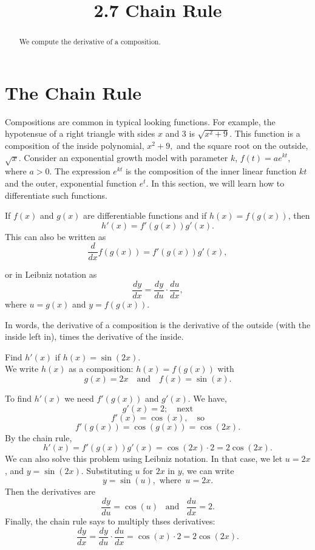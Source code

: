 \documentclass{ximera}
\title{2.7 Chain Rule}
\begin{document}
\begin{abstract}
We compute the derivative of  a composition.
\end{abstract}

\maketitle

\section{The Chain Rule}

Compositions are common in typical looking functions.
For example, the hypotensue of a right triangle with sides $x$ and $3$ is $\sqrt{x^2 + 9}$.  This function is a composition of the inside polynomial, $x^2 + 9,$
and the square root on the outside, $\sqrt{x}$.
Consider an exponential growth model with parameter $k$, $f(t) = ae^{kt}$, where $a>0$. The expression $e^{kt}$ is the composition of the inner linear function $kt$
and the outer, exponential function $e^t$. In this section, we will learn how to differentiate such functions.
\begin{theorem} If $f(x)$ and $g(x)$ are differentiable functions and if $h(x) = f(g(x))$, then
\[
h'(x) = f'(g(x))g'(x).
\]
This can also be written as 
\[
\frac{d}{dx}f(g(x)) = f'(g(x))g'(x),
\]

or in Leibniz notation as 
\[
\frac{dy}{dx} = \frac{dy}{du} \cdot \frac{du}{dx},
\]
where $u = g(x)$ and $y= f(g(x))$.
\end{theorem}



In words, the derivative of a composition is the derivative of the outside (with the inside left in),   
times the derivative of the inside.



\begin{example}[example 1]
Find $h'(x)$ if $h(x) = \sin(2x)$.\\
We write $h(x)$ as a composition: $h(x)=f(g(x))$ with
\[g(x) = 2x   \quad \text{and} \quad  f(x) = \sin(x).\]


To find $h'(x)$ we need $f'(g(x))$ and $g'(x)$. We have,
\[g'(x) = 2; \quad \text{next} \]
\[f'(x) = \cos(x), \quad \text{so}\]
\[f'(g(x)) =\cos(g(x)) = \cos(2x).\]
By the chain rule,
\[h'(x) = f'(g(x))g'(x) = \cos(2x) \cdot 2 = 2\cos(2x).\]
We can also solve this problem using Leibniz notation.  In that case, we let $u = 2x$, and $y=\sin(2x)$.
Substituting $u$ for $2x$ in $y$, we can write 
\[
y = \sin(u),  \text{ where } \, u = 2x.
\]
Then the derivatives are
\[
\frac{dy}{du} = \cos(u)  \,\,\,\text{  and  }  \,\,\,\frac{du}{dx} = 2.
\]
Finally, the chain rule says to multiply thses derivatives:
\[
\frac{dy}{dx} = \frac{dy}{du} \cdot \frac{du}{dx} = \cos(x) \cdot 2 = 2\cos(2x).
\]
\end{example}
\end{document}
